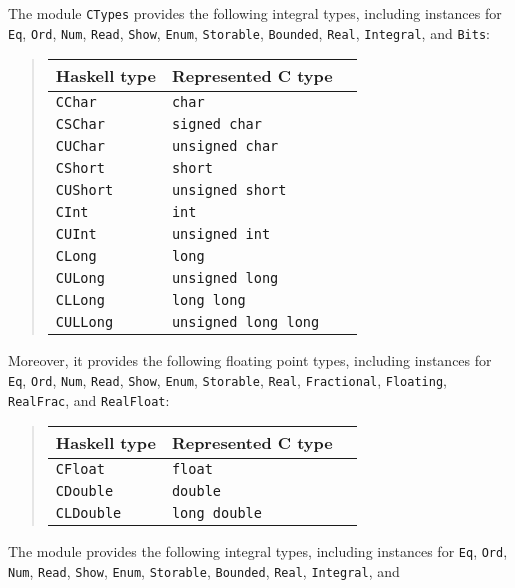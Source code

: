 \documentclass[a4paper,twoside]{article}
\newcommand{\code}[1]{\texttt{#1}}      %
\begin{document}
The module \code{CTypes} provides the following integral types, including
instances for \code{Eq}, \code{Ord}, \code{Num}, \code{Read}, \code{Show},
\code{Enum}, \code{Storable}, \code{Bounded}, \code{Real}, \code{Integral},
and \code{Bits}:
%
\begin{quote}
  \begin{tabular}{|l|l|l|}
    \hline
    Haskell type     & Represented C type\\\hline\hline
    \code{CChar}     & \code{char}\\\hline
    \code{CSChar}    & \code{signed char}\\\hline
    \code{CUChar}    & \code{unsigned char}\\\hline
    \code{CShort}    & \code{short}\\\hline
    \code{CUShort}   & \code{unsigned short}\\\hline
    \code{CInt}      & \code{int}\\\hline
    \code{CUInt}     & \code{unsigned int}\\\hline
    \code{CLong}     & \code{long}\\\hline
    \code{CULong}    & \code{unsigned long}\\\hline
    \code{CLLong}    & \code{long long}\\\hline
    \code{CULLong}   & \code{unsigned long long}\\\hline
  \end{tabular}
\end{quote}
%
Moreover, it provides the following floating point types, including instances
for \code{Eq}, \code{Ord}, \code{Num}, \code{Read}, \code{Show}, \code{Enum},
\code{Storable}, \code{Real}, \code{Fractional}, \code{Floating},
\code{RealFrac}, and \code{RealFloat}:
%
\begin{quote}
  \begin{tabular}{|l|l|l|}
    \hline
    Haskell type     & Represented C type\\\hline\hline
    \code{CFloat}    & \code{float}\\\hline
    \code{CDouble}   & \code{double}\\\hline
    \code{CLDouble}  & \code{long double}\\\hline
  \end{tabular}
\end{quote}
%
The module provides the following integral types, including instances for
\code{Eq}, \code{Ord}, \code{Num}, \code{Read}, \code{Show}, \code{Enum},
\code{Storable}, \code{Bounded}, \code{Real}, \code{Integral}, and
\end{document}
